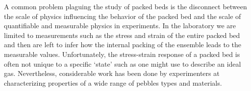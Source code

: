 A common problem plaguing the study of packed beds is the disconnect between the scale of physics influencing the behavior of the packed bed and the scale of quantifiable and measurable physics in experiments. In the laboratory we are limited to measurements such as the stress and strain of the entire packed bed and then are left to infer how the internal packing of the ensemble leads to the measurable values. Unfortunately, the stress-strain response of a packed bed is often not unique to a specific `state' such as one might use to describe an ideal gas. Nevertheless, considerable work has been done by experimenters at characterizing properties of a wide range of pebbles types and materials.






